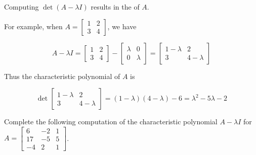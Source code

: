 \begin{applicationActivities}{3}{27}
\begin{definition}
Computing \(\det(A-\lambda I)\) results in the
 of \(A\).

For example, when
\(A=\begin{bmatrix}1 & 2 \\ 3 & 4\end{bmatrix}\), we have

\[
  A-\lambda I=
  \begin{bmatrix}1 & 2 \\ 3 & 4\end{bmatrix}-
  \begin{bmatrix}\lambda & 0 \\ 0 & \lambda\end{bmatrix}=
  \begin{bmatrix}1-\lambda & 2 \\ 3 & 4-\lambda\end{bmatrix}
\]

Thus the characteristic polynomial of \(A\) is

\[
  \det\begin{bmatrix}1-\lambda & 2 \\ 3 & 4-\lambda\end{bmatrix}
=
  (1-\lambda)(4-\lambda)-6
=
  \lambda^2-5\lambda-2
\]
\end{definition}

\begin{activity}{15}
  Complete the following computation of the characteristic polynomial
  \(A-\lambda I\) for
  $A=\begin{bmatrix} 6 & -2 & 1 \\ 17 & -5 & 5 \\ -4 & 2 & 1 \end{bmatrix}$.


\end{activity}
\end{applicationActivities}
